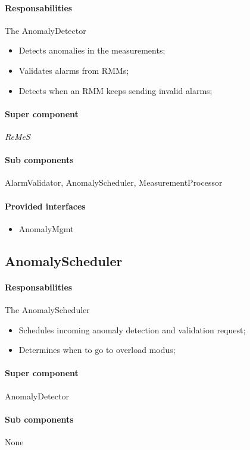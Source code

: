 \documentclass[a4paper,10pt]{article}
\newcommand{\rem}{\emph{ReMeS}\xspace}
\begin{document}
\paragraph{Responsabilities} 
The AnomalyDetector
\begin{itemize}
    \item Detects anomalies in the measurements;
    \item Validates alarms from RMMs;
    \item Detects when an RMM keeps sending invalid alarms;
\end{itemize}

\paragraph{Super component} \rem

\paragraph{Sub components} AlarmValidator, AnomalyScheduler, MeasurementProcessor

\paragraph{Provided interfaces}
\begin{itemize}
	\item AnomalyMgmt
\end{itemize}

\subsection{AnomalyScheduler}
\paragraph{Responsabilities} 
The AnomalyScheduler
\begin{itemize}
	\item Schedules incoming anomaly detection and validation request;
    \item Determines when to go to overload modus;
\end{itemize}

\paragraph{Super component} AnomalyDetector

\paragraph{Sub components} None
\end{document}
